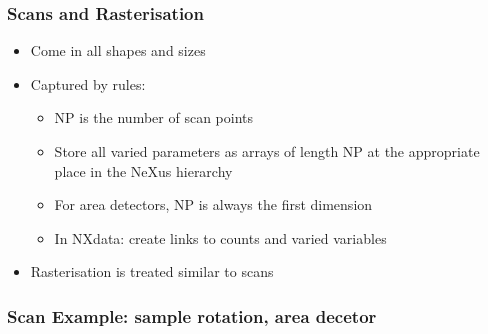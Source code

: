 \documentclass{beamer}
\begin{document}
\begin{frame}
\frametitle{Scans and Rasterisation}
\begin{itemize}
\item Come in all shapes and sizes
\item Captured by rules:
\begin{itemize}
\item NP is the number of scan points
\item Store all varied parameters as arrays of length NP at the 
  appropriate place in the NeXus hierarchy
\item For area detectors, NP is always the first dimension
\item In NXdata: create links to counts and varied variables
\end{itemize}
\item Rasterisation is treated similar to scans
\end{itemize}
\end{frame}

\begin{frame} \frametitle{Scan Example: sample rotation, area decetor}
\begin{figure}[!ht]
\end{figure}
\end{frame}
\end{document}
